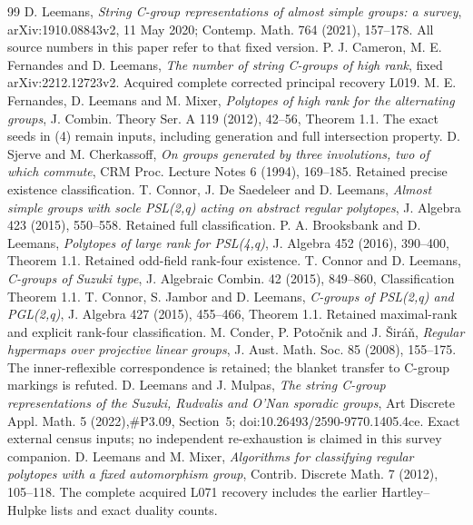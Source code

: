 \documentclass[11pt]{article}
\begin{document}
\begin{thebibliography}{99}
 D. Leemans, \emph{String C-group representations of almost
simple groups: a survey}, arXiv:1910.08843v2, 11 May 2020; Contemp. Math. 764
(2021), 157--178. All source numbers in this paper refer to that fixed version.
 P. J. Cameron, M. E. Fernandes and D. Leemans,
\emph{The number of string C-groups of high rank}, fixed
arXiv:2212.12723v2. Acquired complete corrected principal recovery L019.
 M. E. Fernandes, D. Leemans and M. Mixer,
\emph{Polytopes of high rank for the alternating groups},
J. Combin. Theory Ser. A 119 (2012), 42--56, Theorem 1.1. The exact seeds in (4)
remain inputs, including generation and full intersection property.
 D. Sjerve and M. Cherkassoff, \emph{On groups generated by
three involutions, two of which commute}, CRM Proc. Lecture Notes 6
(1994), 169--185. Retained precise existence classification.
 T. Connor, J. De Saedeleer and D. Leemans,
\emph{Almost simple groups with socle PSL(2,q) acting on abstract regular
polytopes}, J. Algebra 423 (2015), 550--558. Retained full classification.
 P. A. Brooksbank and D. Leemans,
\emph{Polytopes of large rank for PSL(4,q)}, J. Algebra 452 (2016), 390--400,
Theorem 1.1. Retained odd-field rank-four existence.
 T. Connor and D. Leemans, \emph{C-groups of Suzuki type},
J. Algebraic Combin. 42 (2015), 849--860, Classification Theorem 1.1.
 T. Connor, S. Jambor and D. Leemans,
\emph{C-groups of PSL(2,q) and PGL(2,q)}, J. Algebra 427 (2015), 455--466,
Theorem 1.1. Retained maximal-rank and explicit rank-four classification.
 M. Conder, P. Poto\v cnik and J. \v Sir\'a\v n,
\emph{Regular hypermaps over projective linear groups},
J. Aust. Math. Soc. 85 (2008), 155--175. The inner-reflexible correspondence
is retained; the blanket transfer to C-group markings is refuted.
 D. Leemans and J. Mulpas,
\emph{The string C-group representations of the Suzuki, Rudvalis and
O'Nan sporadic groups}, Art Discrete Appl. Math. 5 (2022),\#P3.09,
Section~5; doi:10.26493/2590-9770.1405.4ce. Exact external census inputs;
no independent re-exhaustion is claimed in this survey companion.
 D. Leemans and M. Mixer, \emph{Algorithms for
classifying regular polytopes with a fixed automorphism group},
Contrib. Discrete Math. 7 (2012), 105--118. The complete acquired L071
recovery includes the earlier Hartley--Hulpke lists and exact duality counts.
\end{thebibliography}
\end{document}
